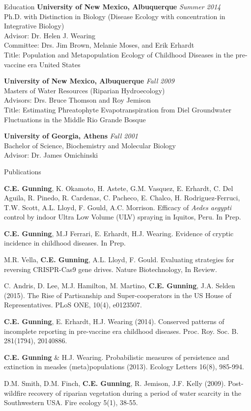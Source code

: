 \documentclass{resume} %
\begin{document}
\begin{rSection}{Education}
{\bf University of New Mexico, Albuquerque} \hfill {\em Summer 2014} \\ 
Ph.D. with Distinction in Biology (Disease Ecology with concentration in
Integrative Biology) \\
Advisor: Dr. Helen J. Wearing\\
Committee: Drs. Jim Brown, Melanie Moses, and Erik Erhardt\\
Title: Population and Metapopulation Ecology of
Childhood Diseases in the pre-vaccine era United States

{\bf University of New Mexico, Albuquerque} \hfill {\em Fall 2009} \\ 
Masters of Water Resources (Riparian Hydroecology) \\
Advisors: Drs. Bruce Thomson and Roy Jemison \\
Title: Estimating Phreatophyte Evapotranspiration from Diel Groundwater Fluctuations in the Middle Rio Grande Bosque

{\bf University of Georgia, Athens} \hfill {\em Fall 2001} \\ 
Bachelor of Science, Biochemistry and Molecular Biology \\
Advisor: Dr. James Omichinski
\end{rSection}


\begin{rSection}{Publications}

{\bf C.E. Gunning}, K. Okamoto, H. Astete, G.M. Vasquez, E. Erhardt, 
C. Del Aguila, R. Pinedo, R. Cardenas, C. Pacheco, E. Chalco, 
H. Rodriguez-Ferruci, T.W. Scott, A.L. Lloyd, F. Gould, A.C. Morrison.
Efficacy of {\em Aedes aegypti} control by indoor Ultra Low Volume (ULV) spraying 
in Iquitos, Peru. In Prep.

{\bf C.E. Gunning}, M.J Ferrari, E. Erhardt, H.J. Wearing.
Evidence of cryptic incidence in childhood diseases. In Prep.

M.R. Vella, {\bf C.E. Gunning}, A.L. Lloyd, F. Gould.
Evaluating strategies for reversing CRISPR-Cas9 gene drives.
Nature Biotechnology, In Review.

C. Andris, D. Lee, M.J.  Hamilton, M. Martino, {\bf C.E. Gunning},  J.A. Selden (2015).
The Rise of Partisanship and Super-cooperators in the US House of Representatives.
PLoS ONE, 10(4), e0123507.

{\bf C.E. Gunning}, E. Erhardt, H.J. Wearing (2014). 
Conserved patterns of incomplete reporting in pre-vaccine era childhood diseases.
Proc. Roy. Soc. B. 281(1794), 20140886. 

{\bf C.E. Gunning} \& H.J. Wearing. Probabilistic measures of persistence
and extinction in measles (meta)populations (2013).  Ecology Letters 16(8), 985-994.

D.M. Smith, D.M. Finch, {\bf C.E. Gunning}, R. Jemison, J.F. Kelly (2009). Post-wildfire recovery of riparian vegetation during a period of water scarcity in the Southwestern USA. Fire ecology 5(1), 38-55.
\end{rSection}
\end{document}
